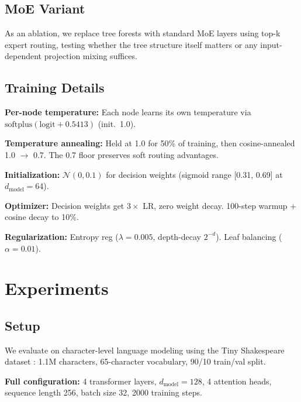 \documentclass[11pt,a4paper]{article}
\begin{document}
\subsection{MoE Variant}

As an ablation, we replace tree forests with standard MoE layers using top-k expert routing, testing whether the tree structure itself matters or any input-dependent projection mixing suffices.

\subsection{Training Details}

\textbf{Per-node temperature:} Each node learns its own temperature via $\text{softplus}(\text{logit} + 0.5413)$ (init.\ 1.0).

\textbf{Temperature annealing:} Held at 1.0 for 50\% of training, then cosine-annealed 1.0 $\to$ 0.7. The 0.7 floor preserves soft routing advantages.

\textbf{Initialization:} $\mathcal{N}(0, 0.1)$ for decision weights (sigmoid range [0.31, 0.69] at $d_{\text{model}}=64$).

\textbf{Optimizer:} Decision weights get $3\times$ LR, zero weight decay. 100-step warmup + cosine decay to 10\%.

\textbf{Regularization:} Entropy reg ($\lambda\!=\!0.005$, depth-decay $2^{-d}$). Leaf balancing ($\alpha\!=\!0.01$).

\section{Experiments}

\subsection{Setup}

We evaluate on character-level language modeling using the Tiny Shakespeare dataset \citep{karpathy2015}: 1.1M characters, 65-character vocabulary, 90/10 train/val split.

\textbf{Full configuration:} 4 transformer layers, $d_{\text{model}}=128$, 4 attention heads, sequence length 256, batch size 32, 2000 training steps.
\end{document}
